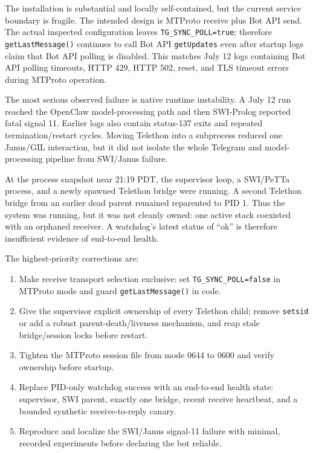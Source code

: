 \documentclass[10pt]{article}
\newcommand{\code}[1]{\texttt{#1}}
\begin{document}
The installation is substantial and locally self-contained, but the current service boundary is fragile. The intended design is MTProto receive plus Bot API send. The actual inspected configuration leaves \code{TG\_SYNC\_POLL=true}; therefore \code{getLastMessage()} continues to call Bot API \code{getUpdates} even after startup logs claim that Bot API polling is disabled. This matches July 12 logs containing Bot API polling timeouts, HTTP 429, HTTP 502, reset, and TLS timeout errors during MTProto operation.

The most serious observed failure is native runtime instability. A July 12 run reached the OpenClaw model-processing path and then SWI-Prolog reported fatal signal 11. Earlier logs also contain status-137 exits and repeated termination/restart cycles. Moving Telethon into a subprocess reduced one Janus/GIL interaction, but it did not isolate the whole Telegram and model-processing pipeline from SWI/Janus failure.

At the process snapshot near 21:19 PDT, the supervisor loop, a SWI/PeTTa process, and a newly spawned Telethon bridge were running. A second Telethon bridge from an earlier dead parent remained reparented to PID 1. Thus the system was running, but it was not cleanly owned: one active stack coexisted with an orphaned receiver. A watchdog's latest status of ``ok'' is therefore insufficient evidence of end-to-end health.

The highest-priority corrections are:
\begin{enumerate}
  \item Make receive transport selection exclusive: set \code{TG\_SYNC\_POLL=false} in MTProto mode and guard \code{getLastMessage()} in code.
  \item Give the supervisor explicit ownership of every Telethon child; remove \code{setsid} or add a robust parent-death/liveness mechanism, and reap stale bridge/session locks before restart.
  \item Tighten the MTProto session file from mode 0644 to 0600 and verify ownership before startup.
  \item Replace PID-only watchdog success with an end-to-end health state: supervisor, SWI parent, exactly one bridge, recent receive heartbeat, and a bounded synthetic receive-to-reply canary.
  \item Reproduce and localize the SWI/Janus signal-11 failure with minimal, recorded experiments before declaring the bot reliable.
\end{enumerate}
\end{document}
